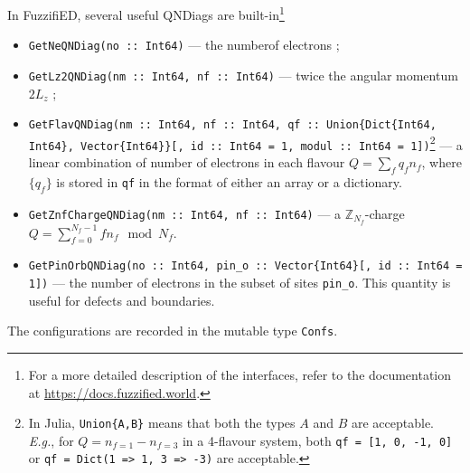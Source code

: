 \documentclass{timesjhep}
\begin{document}
In FuzzifiED, several useful QNDiags are built-in\footnote{For a more detailed description of the interfaces, refer to the documentation at \url{https://docs.fuzzified.world}.}
\begin{itemize}
    \item \lstinline|GetNeQNDiag(no :: Int64)| --- the numberof electrons ;
    \item \lstinline|GetLz2QNDiag(nm :: Int64, nf :: Int64)| --- twice the angular momentum $2L_z$ ;
    \item \lstinline|GetFlavQNDiag(nm :: Int64, nf :: Int64, qf :: Union{Dict{Int64, Int64}, Vector{Int64}}[, id :: Int64 = 1, modul :: Int64 = 1])|\footnote{In Julia, \lstinline[basicstyle=\ttfamily\scriptsize]|Union{A,B}| means that both the types $A$ and $B$ are acceptable. \textit{E.g.}, for $Q=n_{f=1}-n_{f=3}$ in a 4-flavour system, both \lstinline[basicstyle=\ttfamily\scriptsize]|qf = [1, 0, -1, 0]| or \lstinline[basicstyle=\ttfamily\scriptsize]|qf = Dict(1 => 1, 3 => -3)| are acceptable. } --- a linear combination of number of electrons in each flavour $Q=\sum_fq_fn_f$, where $\{q_f\}$ is stored in \lstinline|qf| in the format of either an array or a dictionary. 
    \item \lstinline|GetZnfChargeQNDiag(nm :: Int64, nf :: Int64)| --- a $\mathbb{Z}_{N_f}$-charge $Q=\sum_{f=0}^{N_f-1}fn_f\mod N_f$.
    \item \lstinline|GetPinOrbQNDiag(no :: Int64, pin_o :: Vector{Int64}[, id :: Int64 = 1])| --- the number of electrons in the subset of sites \lstinline|pin_o|. This quantity is useful for defects and boundaries. 
\end{itemize}

The configurations are recorded in the mutable type \lstinline|Confs|. 
\end{document}
